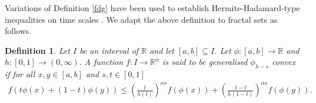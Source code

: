 \documentclass[10pt]{article}
\newtheorem{df}[theo]{Definition}
\begin{document}
Variations of Definition \ref{fdg} have been  used to establish Hermite-Hadamard-type inequalities on time scales \cite{fagbemigun1, fagbemigun2}. We adapt the above definition to fractal sets as follows.




\begin{df} \label{definition}
Let $I$ be an interval of $\mathbb{R}$ and let $[a,b]\subseteq I$. Let $\phi:[a,b]\rightarrow \mathbb{R}$ and $h:[0,1]\rightarrow (0,\infty).$  
A function $f:I\rightarrow \mathbb{R}^\alpha$ is said to be generalised $\phi_{h-s}$ convex if for all $x,y\in [a,b]$ and $s,t\in[0,1]$
\begin{align}
f(t\phi(x)+ (1-t)\phi(y)) \leq \left ( \frac{t}{h(t)} \right)^{\alpha s} f(\phi(x)) + \left ( \frac{1-t}{h(1-t)} \right)^{\alpha s} f(\phi(y)).  \label{deff}
\end{align}

\end{df}
\end{document}
